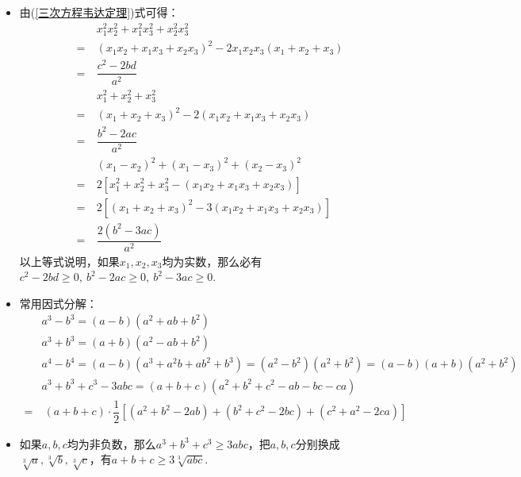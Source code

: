 \begin{itemize}[leftmargin=\inteval{\myitemleftmargin}pt,itemsep=
   \inteval{\myitemitempsep}pt,topsep=\inteval{\myitemtopsep}pt]
\item 由(\ref{三次方程韦达定理})式可得：
\begin{align*}
     &\ x_1^2x_2^2+x_1^2x_3^2+x_2^2x_3^2 \\ 
    =&\  (x_1x_2+x_1x_3+x_2x_3)^2- 2x_1x_2x_3(x_1+x_2+x_3)\\
    =&\  \dfrac{c^2-2bd}{a^2} \\
     &\ x_1^2+x_2^2+x_3^2 \\
    =&\ (x_1+x_2+x_3)^2-2(x_1x_2+x_1x_3+x_2x_3) \\
    =&\ \dfrac{b^2-2ac}{a^2} \\
     &\ (x_1-x_2)^2+(x_1-x_3)^2+(x_2-x_3)^2 \\
    =&\  2[x_1^2+x_2^2+x_3^2-(x_1x_2+x_1x_3 +x_2x_3)]\\ 
    =&\  2[(x_1+x_2+x_3)^2-3(x_1x_2+x_1x_3+x_2x_3)] \\
    =&\  \dfrac{2(b^2-3ac)}{a^2}
\end{align*}
以上等式说明，如果$ x_1,x_2,x_3 $均为实数，那么必有$ c^2-2bd\geq 0,\ b^2-2ac \geq 0,\ 
b^2-3ac \geq 0 $. \\
%

\item 常用因式分解：
\begin{align*}
    &  a^3-b^3=(a-b)(a^2+ab+b^2) \\
    &  a^3+b^3=(a+b)(a^2-ab+b^2) \\
    &  a^4-b^4=(a-b)(a^3+a^2b+ab^2+b^3)=(a^2-b^2)(a^2+b^2)=(a-b)(a+b)(a^2+b^2) \\
    &  a^3+b^3+c^3-3abc=(a+b+c)(a^2+b^2+c^2-ab-bc-ca) \\
    =&\ (a+b+c)\cdot \dfrac{1}{2}\left[(a^2+b^2-2ab)
    +(b^2+c^2-2bc)+(c^2+a^2-2ca) \right]
\end{align*}
\item 如果$ a,b,c $均为非负数，那么$ a^3+b^3+c^3 \geq 3abc $，把$ a,b,c $分别换成
$ \sqrt[3]{a},\sqrt[3]{b},\sqrt[3]{c} $，有$ a+b+c \geq 3 \sqrt[3]{abc}$. 


\end{itemize}
